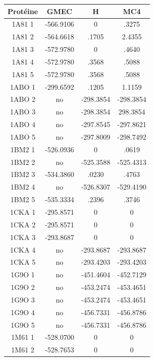 \documentclass[a4paper,12pt]{article}
\begin{document}
    \begin{table}[h]
      \centering

      \begin{tabular}{|c|c|c|c|}


        \hline
        Protéine & GMEC & H & MC4 \\
        \hline
        1A81 1 & -566.9106 & 0 & .3275 \\
        1A81 2 & -564.6618 & .1705 & 2.4355 \\
        1A81 3 & -572.9780 & 0 & .4640 \\
        1A81 4 & -572.9780 & .3568 & .5088 \\
        1A81 5 & -572.9780 & .3568 & .5088 \\
        1ABO 1 & -299.6592 & .1205 & 1.1159 \\
        1ABO 2 & no & -298.3854 & -298.3854 \\
        1ABO 3 & no & -298.3854 & 298.3854 \\
        1ABO 4 & no & -297.8545 & -297.8621 \\
        1ABO 5 & no & -297.8009 & -298.7492 \\
        1BM2 1 & -526.0936 & 0 & .0619 \\
        1BM2 2 & no & -525.3588 & -525.4313 \\
        1BM2 3 & -534.3860 & .0230 & .4763 \\
        1BM2 4 & no & -526.8307 & -529.4190 \\
        1BM2 5 & -535.3334 & .2396 & .3746\\
        1CKA 1 & -295.8571 & 0 & 0 \\
        1CKA 2 & -295.8571 & 0 & 0 \\
        1CKA 3 & -293.8687 & 0 & 0 \\
        1CKA 4 & no & -293.8687 & -293.8687 \\
        1CKA 5 & no & -293.4203 & -293.4203 \\
        1G9O 1 & no & -451.4604 & -452.7129 \\
        1G9O 2 & no & -453.2474 & -453.4651 \\
        1G9O 3 & no & -453.2474 & -453.4651 \\
        1G9O 4 & no & -456.7331 & -456.8786 \\
        1G9O 5 & no & -456.7331 & -456.8786 \\
        1M61 1 & -528.0700 & 0 & 0 \\
        1M61 2 & -528.7653 & 0 & 0 \\

\end{tabular}
\end{table}
\end{document}
